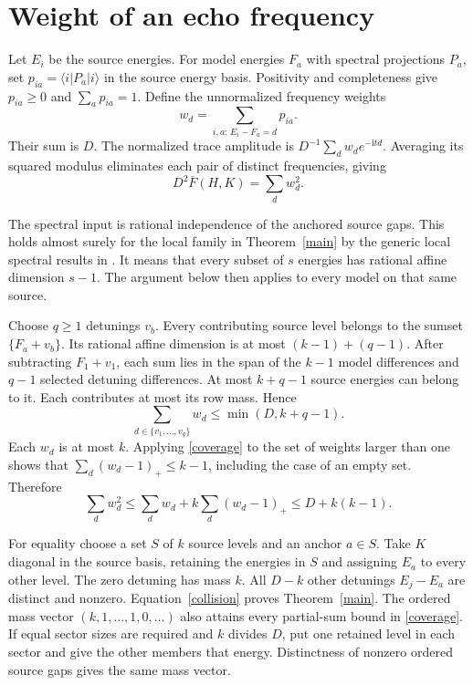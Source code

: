 \documentclass[11pt]{article}
\newcommand{\ii}{\mathrm{i}}
\begin{document}
\section{Weight of an echo frequency}
Let $E_i$ be the source energies. For model energies $F_a$ with spectral projections $P_a$, set $p_{ia}=\langle i|P_a|i\rangle$ in the source energy basis. Positivity and completeness give $p_{ia}\ge0$ and $\sum_a p_{ia}=1$. Define the unnormalized frequency weights
\[
       w_d=\sum_{i,a:\,E_i-F_a=d}p_{ia}.
\]
Their sum is $D$. The normalized trace amplitude is $D^{-1}\sum_d w_d e^{-\ii td}$. Averaging its squared modulus eliminates each pair of distinct frequencies, giving
\begin{equation}\label{collision}
        D^2\overline F(H,K)=\sum_d w_d^2.
\end{equation}

The spectral input is rational independence of the anchored source gaps. This holds almost surely for the local family in Theorem~\ref{main} by the generic local spectral results in \cite{lee,corpus}. It means that every subset of $s$ energies has rational affine dimension $s-1$. The argument below then applies to every model on that same source.

Choose $q\ge1$ detunings $v_b$. Every contributing source level belongs to the sumset $\{F_a+v_b\}$. Its rational affine dimension is at most $(k-1)+(q-1)$. After subtracting $F_1+v_1$, each sum lies in the span of the $k-1$ model differences and $q-1$ selected detuning differences. At most $k+q-1$ source energies can belong to it. Each contributes at most its row mass. Hence
\begin{equation}\label{coverage}
              \sum_{d\in\{v_1,\ldots,v_q\}} w_d \le \min(D,k+q-1).
\end{equation}
Each $w_d$ is at most $k$. Applying \eqref{coverage} to the set of weights larger than one shows that $\sum_d(w_d-1)_+\le k-1$, including the case of an empty set. Therefore
\[
  \sum_d w_d^2 \le \sum_d w_d+k\sum_d(w_d-1)_+ \le D+k(k-1).
\]

For equality choose a set $S$ of $k$ source levels and an anchor $a\in S$. Take $K$ diagonal in the source basis, retaining the energies in $S$ and assigning $E_a$ to every other level. The zero detuning has mass $k$. All $D-k$ other detunings $E_j-E_a$ are distinct and nonzero. Equation~\eqref{collision} proves Theorem~\ref{main}. The ordered mass vector $(k,1,\ldots,1,0,\ldots)$ also attains every partial-sum bound in \eqref{coverage}. If equal sector sizes are required and $k$ divides $D$, put one retained level in each sector and give the other members that energy. Distinctness of nonzero ordered source gaps gives the same mass vector.
\end{document}
